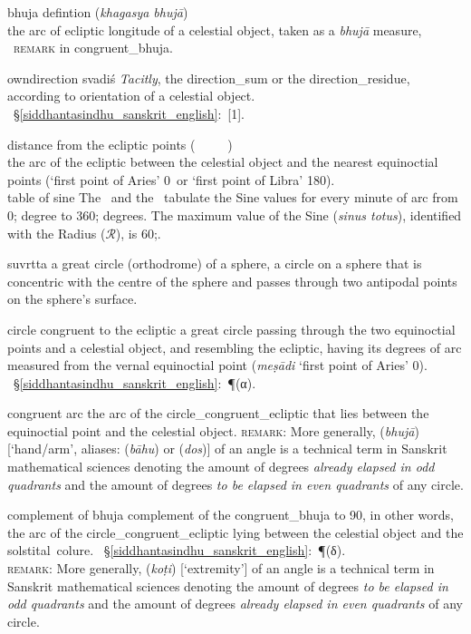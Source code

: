bhuja defintion
 (\textit{khagasya bhujā})\\[5pt]
        the arc of ecliptic longitude of a celestial object, taken as a \textit{bhujā} measure, \vid\ \textsc{remark} in \protect\gls{congruent_bhuja}.

owndirection svadiś
\textit{Tacitly}, the \protect\gls{direction_sum} or the \protect\gls{direction_residue}, according to orientation of a celestial object. \Vid\ \S\thinspace\ref{siddhantasindhu_sanskrit_english}:~[1].

distance from the ecliptic points 
 (\textit{\bud\idafaconsonant\ \daraji\idafavowel\ \kawkab\ \az\ \itidal\idafaconsonant\ \aqrab})\\[5pt]
        the arc of the ecliptic between the celestial object and the nearest equinoctial points (`first point of Aries' 0\degree\ or `first point of Libra' 180\degree).\\[5pt]
        
table of sine
The \ZijiShahJahani\ and the \Siddhantasindhu\ tabulate the Sine values for every minute of arc from 0; degree to 360; degrees. The maximum value of the Sine (\textit{sinus totus}), identified with the Radius ($\mathcal{R}$), is 60;.

suvrtta
a great circle (orthodrome) of a sphere, \ie a circle on a sphere that is concentric with the centre of the sphere and passes through two antipodal points on the sphere's surface.


circle congruent to the ecliptic
a great circle passing through the two equinoctial points and a celestial object, and resembling the ecliptic, \ie having its degrees of arc measured from the vernal equinoctial point  (\textit{meṣādi} `first point of Aries' 0\degree). \Vid\ \S\thinspace\ref{siddhantasindhu_sanskrit_english}:~{\footnotesize \P}\thinspace(α).

congruent arc
the arc of the \protect\gls{circle_congruent_ecliptic} that lies between the equinoctial point and the celestial object. 
\textsc{remark}:  More generally,  (\textit{bhujā}) [\lit `hand/arm', aliases:  (\textit{bāhu}) or  (\textit{dos})] of an angle is a technical term in Sanskrit mathematical sciences denoting the amount of degrees \textit{already elapsed in odd quadrants} and the amount of degrees \textit{to be elapsed in even quadrants} of any circle.

complement of bhuja
complement of the \protect\gls{congruent_bhuja} to 90\degree, in other words, the arc of the \protect\gls{circle_congruent_ecliptic} lying between the celestial object and the solstital~colure. \Vid\ \S\thinspace\ref{siddhantasindhu_sanskrit_english}:~{\footnotesize \P}\thinspace(δ).\\[5pt]
       \textsc{remark}: More generally,  (\textit{koṭi}) [\lit `extremity'] of an angle is a technical term in Sanskrit mathematical sciences denoting the amount of degrees \textit{to be elapsed in odd quadrants} and the amount of degrees \textit{already elapsed in even quadrants} of any circle.\\[5pt]

